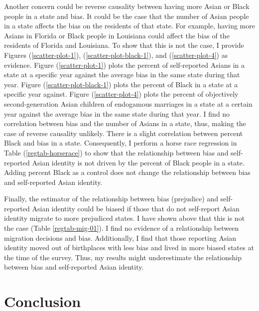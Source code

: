 Another concern could be reverse causality between having more Asian or Black people in a state and bias. It could be the case that the number of Asian people in a state affects the bias on the residents of that state. For example, having more Asians in Florida or Black people in Louisiana could affect the  bias of the residents of Florida and Louisiana. To show that this is not the case, I provide Figures (\ref{scatter-plot-1}), (\ref{scatter-plot-black-1}), and (\ref{scatter-plot-4}) as evidence. Figure (\ref{scatter-plot-1}) plots the percent of self-reported Asians in a state at a specific year against the average  bias in the same state during that year. Figure (\ref{scatter-plot-black-1}) plots the percent of Black in a state at a specific year against. Figure (\ref{scatter-plot-4}) plots the percent of objectively second-generation Asian children of endogamous marriages in a state at a certain year against the average bias in the same state during that year. I find no correlation between bias and the number of Asians in a state, thus, making the case of reverse causality unlikely. There is a slight correlation between percent Black and bias in a state. Consequently, I perform a horse race regression in Table (\ref{regtab-horserace}) to show that the relationship between bias and self-reported Asian identity is not driven by the percent of Black people in a state. Adding percent Black as a control does not change the relationship between bias and self-reported Asian identity.

Finally, the estimator of the relationship between bias (prejudice) and self-reported Asian identity could be biased if those that do not self-report Asian identity migrate to more prejudiced states. I have shown above that this is not the case (Table \ref{regtab-mig-01}). I find no evidence of a relationship between migration decisions and bias. Additionally, I find that those reporting Asian identity moved out of birthplaces with less bias and lived in more biased states at the time of the survey. Thus, my results might underestimate the relationship between bias and self-reported Asian identity.

\section{Conclusion}\label{sec:conc}


